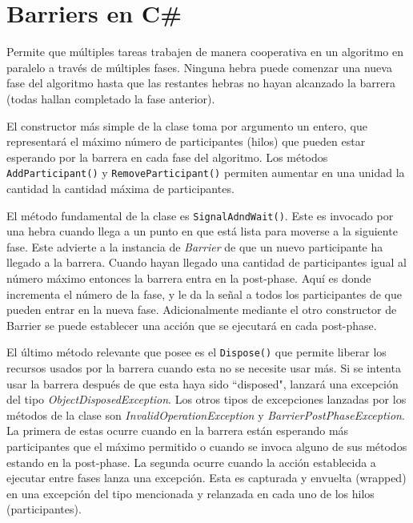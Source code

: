 \documentclass[12pt]{amsart}
\theoremstyle{definition}
\numberwithin{equation}{section}
\newcommand{\csl}[1]{\texttt{#1}}
\begin{document}
\section{Barriers en C\#}

Permite que múltiples tareas trabajen de manera cooperativa en un algoritmo en paralelo a través de múltiples fases. Ninguna hebra puede comenzar una nueva fase del algoritmo hasta que las restantes hebras no hayan alcanzado la barrera (todas hallan completado la fase anterior).

El constructor m\'as simple de la clase toma por argumento un entero, que representar\'a el m\'aximo n\'umero de participantes (hilos) que pueden estar esperando por la barrera en cada fase del algoritmo. Los m\'etodos \csl{AddParticipant()} y \csl{RemoveParticipant()} permiten aumentar en una unidad la cantidad la cantidad m\'axima de participantes. 

El m\'etodo fundamental de la clase es \csl{SignalAdndWait()}. Este es invocado por una hebra cuando llega a un punto en que est\'a lista para moverse a la siguiente fase. Este advierte a la instancia de \emph{Barrier} de que un nuevo participante ha llegado a la barrera. Cuando hayan llegado una cantidad de participantes igual al n\'umero m\'aximo entonces la barrera entra en la post-phase. Aqu\'i es donde incrementa el n\'umero de la fase, y le da la se\~nal a todos los participantes de que pueden entrar en la nueva fase. Adicionalmente mediante el otro constructor de Barrier se puede establecer una acci\'on que se ejecutar\'a en cada post-phase. 

El \'ultimo m\'etodo relevante que posee es el \csl{Dispose()} que permite liberar los recursos usados por la barrera cuando esta no se necesite usar m\'as. Si se intenta usar la barrera despu\'es de que esta haya sido ``disposed", lanzar\'a una excepci\'on del tipo \emph{ObjectDisposedException}. Los otros tipos de excepciones lanzadas por los m\'etodos de la clase son \emph{InvalidOperationException} y \emph{BarrierPostPhaseException}. La primera de estas ocurre cuando en la barrera est\'an esperando m\'as participantes que el m\'aximo permitido o cuando se invoca alguno de sus m\'etodos estando en la post-phase. La segunda ocurre cuando la acci\'on establecida a ejecutar entre fases lanza una excepci\'on. Esta es capturada y envuelta (wrapped) en una excepci\'on del tipo mencionada y relanzada en cada uno de los hilos (participantes).
\end{document}
